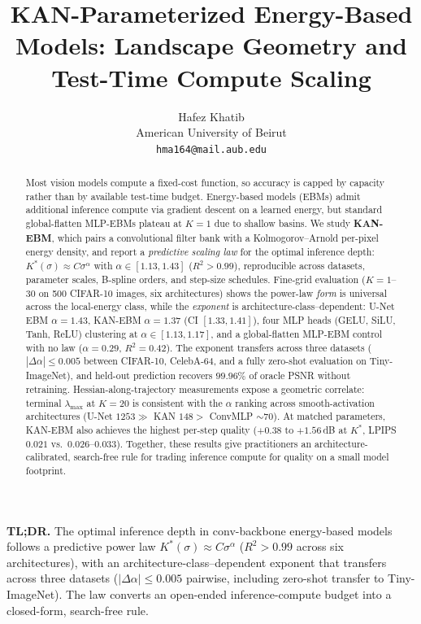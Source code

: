 \documentclass{article}
\title{KAN-Parameterized Energy-Based Models: Landscape Geometry and Test-Time Compute Scaling}
\author{%
  Hafez Khatib \\
  American University of Beirut \\
  \texttt{hma164@mail.aub.edu}
}
\begin{document}
\maketitle

{\small\noindent\textbf{TL;DR.} The optimal inference depth in conv-backbone energy-based models follows a predictive power law $K^*(\sigma) \!\approx\! C\sigma^\alpha$ ($R^2 \!>\! 0.99$ across six architectures), with an architecture-class--dependent exponent that transfers across three datasets ($|\Delta\alpha|\!\leq\!0.005$ pairwise, including zero-shot transfer to Tiny-ImageNet). The law converts an open-ended inference-compute budget into a closed-form, search-free rule.}

\begin{abstract}
Most vision models compute a fixed-cost function, so accuracy is capped by capacity rather than by available test-time budget. Energy-based models (EBMs) admit additional inference compute via gradient descent on a learned energy, but standard global-flatten MLP-EBMs plateau at $K{=}1$ due to shallow basins. We study \textbf{KAN-EBM}, which pairs a convolutional filter bank with a Kolmogorov--Arnold per-pixel energy density, and report a \emph{predictive scaling law} for the optimal inference depth: $K^{*}(\sigma) \approx C\sigma^{\alpha}$ with $\alpha \in [1.13, 1.43]$ ($R^2{>}0.99$), reproducible across datasets, parameter scales, B-spline orders, and step-size schedules. Fine-grid evaluation ($K{=}1$--$30$ on 500 CIFAR-10 images, six architectures) shows the power-law \emph{form} is universal across the local-energy class, while the \emph{exponent} is architecture-class--dependent: U-Net EBM $\alpha{=}1.43$, KAN-EBM $\alpha{=}1.37$ (CI $[1.33, 1.41]$), four MLP heads (GELU, SiLU, Tanh, ReLU) clustering at $\alpha \in [1.13, 1.17]$, and a global-flatten MLP-EBM control with no law ($\alpha{=}0.29$, $R^2{=}0.42$). The exponent transfers across three datasets ($|\Delta\alpha|\!\leq\!0.005$ between CIFAR-10, CelebA-64, and a fully zero-shot evaluation on Tiny-ImageNet), and held-out prediction recovers $99.96\%$ of oracle PSNR without retraining. Hessian-along-trajectory measurements expose a geometric correlate: terminal $\lambda_{\max}$ at $K{=}20$ is consistent with the $\alpha$ ranking across smooth-activation architectures (U-Net $1253 \!\gg\!$ KAN $148 \!>\!$ ConvMLP $\sim$70). At matched parameters, KAN-EBM also achieves the highest per-step quality ($+0.38$ to $+1.56$\,dB at $K^*$, LPIPS $0.021$ vs.~$0.026$--$0.033$). Together, these results give practitioners an architecture-calibrated, search-free rule for trading inference compute for quality on a small model footprint.
\end{abstract}
\end{document}
